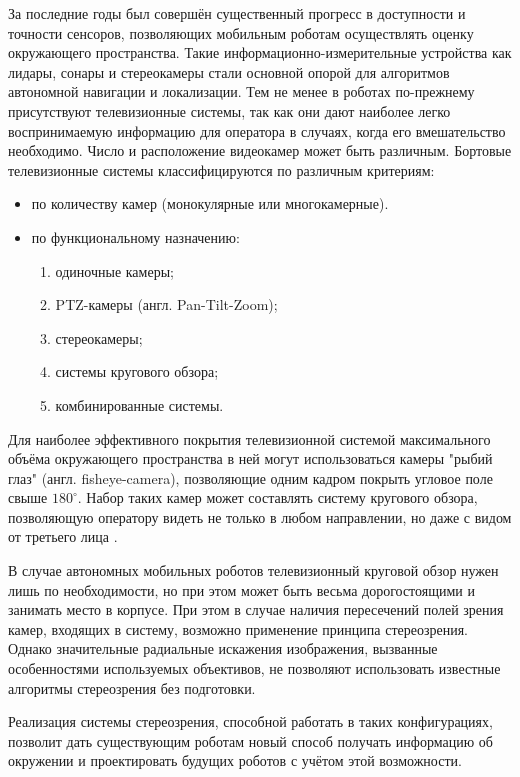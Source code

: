 За последние годы был совершён существенный прогресс в доступности и точности сенсоров, позволяющих мобильным роботам 
осуществлять оценку окружающего пространства. Такие информационно-измерительные устройства как лидары, сонары и стереокамеры
 стали основной опорой для алгоритмов автономной навигации и локализации. Тем не менее в роботах по-прежнему 
присутствуют телевизионные системы, так как они дают наиболее легко воспринимаемую информацию для оператора в случаях, когда 
его вмешательство необходимо. 
Число и расположение видеокамер может быть различным. Бортовые телевизионные системы классифицируются по различным 
критериям\cite{varlashin}:
\begin{itemize} 
    \item по количеству камер (монокулярные или многокамерные).
    \item по функциональному назначению:
    \begin{enumerate} 
        \item одиночные камеры;
        \item PTZ-камеры (англ. Pan-Tilt-Zoom);
        \item стереокамеры;
        \item системы кругового обзора;
        \item комбинированные системы.
    \end{enumerate}
\end{itemize}

Для наиболее эффективного покрытия телевизионной системой максимального объёма окружающего пространства в ней могут использоваться 
камеры "рыбий глаз" (англ. fisheye-camera), позволяющие одним кадром покрыть угловое поле свыше $180^\circ$.  
Набор таких камер может составлять систему кругового обзора, позволяющую оператору видеть не только в любом направлении,                
но даже с видом от третьего лица \cite{birdeye}. 
    
В случае автономных мобильных роботов телевизионный круговой обзор нужен лишь по необходимости, но при этом может быть весьма 
дорогостоящими и занимать место в корпусе. При этом в случае наличия пересечений полей зрения камер, входящих в систему, возможно 
применение принципа стереозрения.
Однако значительные радиальные искажения изображения, вызванные особенностями используемых объективов,
 не позволяют использовать известные алгоритмы стереозрения без подготовки.                                   
 
  Реализация системы стереозрения, способной работать в таких
конфигурациях, позволит дать существующим роботам новый способ получать информацию об окружении и проектировать будущих роботов 
с учётом этой возможности. 

